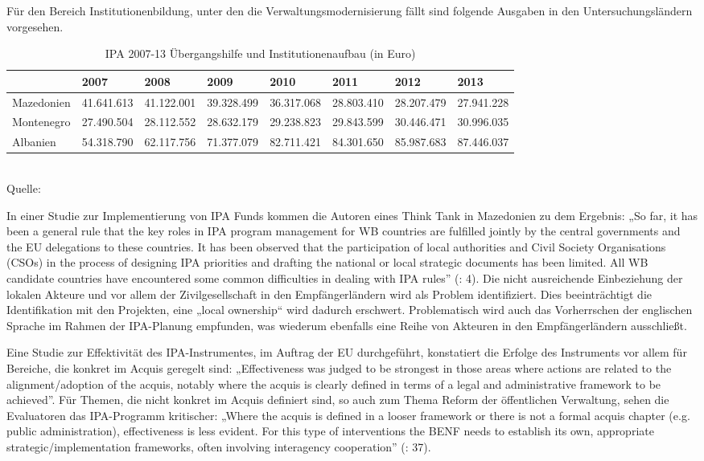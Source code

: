 Für den Bereich Institutionenbildung, unter den die Verwaltungsmodernisierung fällt sind folgende Ausgaben in den Untersuchungsländern vorgesehen. 
\begin{table}[H]
\caption{ IPA 2007-13 Übergangshilfe und Institutionenaufbau (in Euro)}
\small{
\begin{tabular}{|L{12mm}|R{16mm}|R{16mm}|R{16mm}|R{16mm}|R{16mm}|R{16mm}|R{16mm}|}\hline
&2007&
2008&
2009&
2010&
2011&
2012&
2013\\\hline
Maze\-donien&
41.641.613&
41.122.001&
39.328.499&
36.317.068&
28.803.410&
28.207.479&
27.941.228\\\hline
Monte\-negro&
27.490.504&
28.112.552&
28.632.179&
29.238.823&
29.843.599&
30.446.471&
30.996.035\\\hline
Alba\-nien&
54.318.790&
62.117.756&
71.377.079&
82.711.421&
84.301.650&
85.987.683&
87.446.037\\\hline
\end{tabular}
}\\

\scriptsize{Quelle: \cite{eurcom09b} }
\end{table}
In einer Studie zur Implementierung von IPA Funds kommen die Autoren eines Think Tank in Mazedonien zu dem Ergebnis: „So far, it has been a general rule that the key roles in IPA program management for WB countries are fulfilled jointly by the central governments and the EU delegations to these countries. It has been observed that the participation of local authorities and Civil Society Organisations (CSOs) in the process of designing IPA priorities and drafting the national or local strategic documents has been limited. All WB candidate countries have encountered some common difficulties in dealing with IPA rules” (\cite{eurmov10}: 4). Die nicht ausreichende Einbeziehung der lokalen Akteure und vor allem der Zivilgesellschaft in den Empfängerländern wird als Problem identifiziert. Dies beeinträchtigt die Identifikation mit den Projekten, eine „local ownership“ wird dadurch erschwert. Problematisch wird auch das Vorherrschen der englischen Sprache im Rahmen der IPA-Planung empfunden, was wiederum ebenfalls eine Reihe von Akteuren in den Empfängerländern ausschließt.\par
Eine Studie zur Effektivität des IPA-Instrumentes, im Auftrag der EU durchgeführt, konstatiert die Erfolge des Instruments vor allem für Bereiche, die konkret im Acquis geregelt sind: „Effectiveness was judged to be strongest in those areas where actions are related to the alignment/adoption of the acquis, notably where the acquis is clearly defined in terms of a legal and administrative framework to be achieved”. Für Themen, die nicht konkret im Acquis definiert sind, so auch zum Thema Reform der öffentlichen Verwaltung, sehen die Evaluatoren das IPA-Programm kritischer: „Where the acquis is defined in a looser framework or there is not a formal acquis chapter (e.g. public administration), effectiveness is less evident. For this type of interventions the BENF needs to establish its own, appropriate strategic/implementation frameworks, often involving interagency cooperation” (\cite{htspe}: 37).\par

